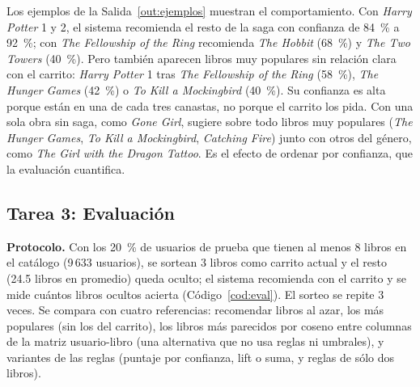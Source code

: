 \documentclass[11pt,letterpaper]{article}
\begin{document}
Los ejemplos de la Salida~\ref{out:ejemplos} muestran el comportamiento. Con \textit{Harry Potter} 1 y 2, el sistema recomienda el resto de la saga con confianza de 84~\% a 92~\%; con \textit{The Fellowship of the Ring} recomienda \textit{The Hobbit} (68~\%) y \textit{The Two Towers} (40~\%). Pero también aparecen libros muy populares sin relación clara con el carrito: \textit{Harry Potter} 1 tras \textit{The Fellowship of the Ring} (58~\%), \textit{The Hunger Games} (42~\%) o \textit{To Kill a Mockingbird} (40~\%). Su confianza es alta porque están en una de cada tres canastas, no porque el carrito los pida. Con una sola obra sin saga, como \textit{Gone Girl}, sugiere sobre todo libros muy populares (\textit{The Hunger Games}, \textit{To Kill a Mockingbird}, \textit{Catching Fire}) junto con otros del género, como \textit{The Girl with the Dragon Tattoo}. Es el efecto de ordenar por confianza, que la evaluación cuantifica.

\subsection{Tarea 3: Evaluación}

\textbf{Protocolo.} Con los 20~\% de usuarios de prueba que tienen al menos 8 libros en el catálogo (9\,633 usuarios), se sortean 3 libros como carrito actual y el resto (24.5 libros en promedio) queda oculto; el sistema recomienda con el carrito y se mide cuántos libros ocultos acierta (Código~\ref{cod:eval}). El sorteo se repite 3 veces. Se compara con cuatro referencias: recomendar libros al azar, los más populares (sin los del carrito), los libros más parecidos por coseno entre columnas de la matriz usuario-libro (una alternativa que no usa reglas ni umbrales), y variantes de las reglas (puntaje por confianza, lift o suma, y reglas de sólo dos libros).
\end{document}
